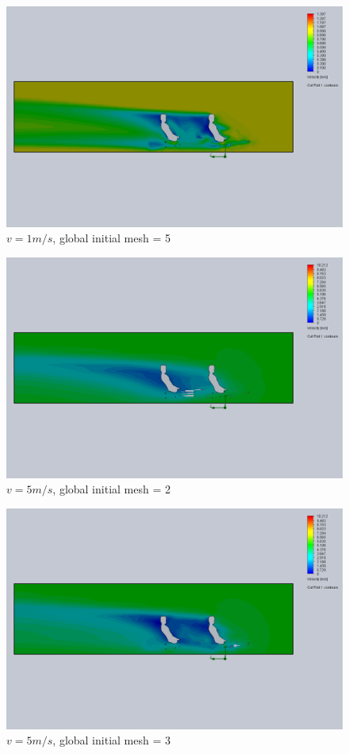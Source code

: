 \documentclass[11pt]{article}
\begin{document}
\begin{figure}
\includegraphics[width=\textwidth]{gm_5_rf_7_v01.png}
\caption{$v = 1 m/s$, global initial mesh = 5}
\end{figure}


\begin{figure}
\includegraphics[width=\textwidth]{gm_2_rf_7_v05.png}
\caption{$v = 5 m/s$, global initial mesh = 2}
\end{figure}

\begin{figure}
\includegraphics[width=\textwidth]{gm_3_rf_7_v05.png}
\caption{$v = 5 m/s$, global initial mesh = 3}
\end{figure}
\end{document}
